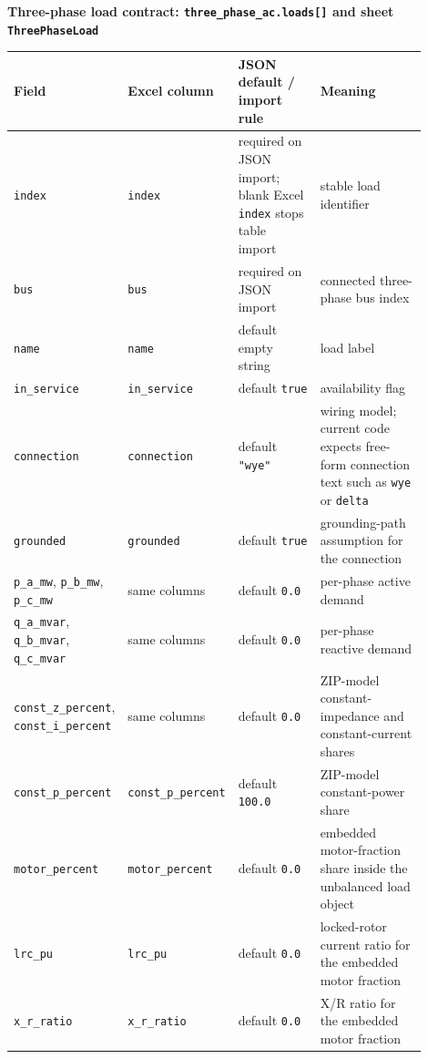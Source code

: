 \noindent\textbf{Three-phase load contract: \texttt{three\_phase\_ac.loads[]} and sheet \texttt{ThreePhaseLoad}}

\begin{longtable}{L{0.20\linewidth}L{0.24\linewidth}L{0.20\linewidth}L{0.26\linewidth}}
\toprule
Field & Excel column & JSON default / import rule & Meaning \\
\midrule
\endhead
\texttt{index} & \texttt{index} & required on JSON import; blank Excel \texttt{index} stops table import & stable load identifier \\
\texttt{bus} & \texttt{bus} & required on JSON import & connected three-phase bus index \\
\texttt{name} & \texttt{name} & default empty string & load label \\
\texttt{in\_service} & \texttt{in\_service} & default \texttt{true} & availability flag \\
\texttt{connection} & \texttt{connection} & default \texttt{"wye"} & wiring model; current code expects free-form connection text such as \texttt{wye} or \texttt{delta} \\
\texttt{grounded} & \texttt{grounded} & default \texttt{true} & grounding-path assumption for the connection \\
\texttt{p\_a\_mw}, \texttt{p\_b\_mw}, \texttt{p\_c\_mw} & same columns & default \texttt{0.0} & per-phase active demand \\
\texttt{q\_a\_mvar}, \texttt{q\_b\_mvar}, \texttt{q\_c\_mvar} & same columns & default \texttt{0.0} & per-phase reactive demand \\
\texttt{const\_z\_percent}, \texttt{const\_i\_percent} & same columns & default \texttt{0.0} & ZIP-model constant-impedance and constant-current shares \\
\texttt{const\_p\_percent} & \texttt{const\_p\_percent} & default \texttt{100.0} & ZIP-model constant-power share \\
\texttt{motor\_percent} & \texttt{motor\_percent} & default \texttt{0.0} & embedded motor-fraction share inside the unbalanced load object \\
\texttt{lrc\_pu} & \texttt{lrc\_pu} & default \texttt{0.0} & locked-rotor current ratio for the embedded motor fraction \\
\texttt{x\_r\_ratio} & \texttt{x\_r\_ratio} & default \texttt{0.0} & X/R ratio for the embedded motor fraction \\
\bottomrule
\end{longtable}


